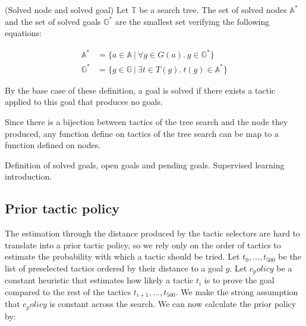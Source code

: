 \documentclass[runningheads,a4paper,draft]{svjour3}
\begin{document}
\begin{definition}(Solved node and solved goal)
Let $\mathbb{T}$ be a search tree. The set of solved nodes $\mathbb{A}^*$ and 
the set of solved goals $\mathbb{G}^*$ are the smallest set verifying the 
following equations:

\begin{align*}
\mathbb{A}^* &= \lbrace a \in \mathbb{A}\ |\ \forall g \in G(a).\ g \in 
\mathbb{G}^* \rbrace\\
\mathbb{G}^* &= \lbrace g \in \mathbb{G}\ |\ \exists t \in T(g).\ t(g) \in 
\mathbb{A}^* \rbrace
\end{align*}

By the base case of these definition, a goal is solved if there exists a tactic 
applied to this goal that produces no goals.



\end{definition}

Since there is a bijection between tactics of the tree search 
and the node they 
produced, any function define on tactics of the tree search can be map to a 
function defined on nodes. 

Definition of solved goals, open goals  and pending goals.
Supervised learning introduction.







\subsection{Prior tactic policy}

The estimation through the distance produced by the tactic selectors are hard 
to translate into a prior tactic policy, so we rely only on the order of 
tactics to estimate the probability with which a tactic should be tried.
Let $t_0,\ldots,t_500$ be the list of preselected tactics ordered by their 
distance to a goal $g$. Let $c_policy$ be a constant heuristic that estimates 
how likely a tactic $t_i$ is to prove the goal compared to the rest of the 
tactics $t_{i+1},\ldots,t_500$. We make the strong assumption that $c_policy$ 
is constant across the search. We can now calculate the prior policy by:
\end{document}
